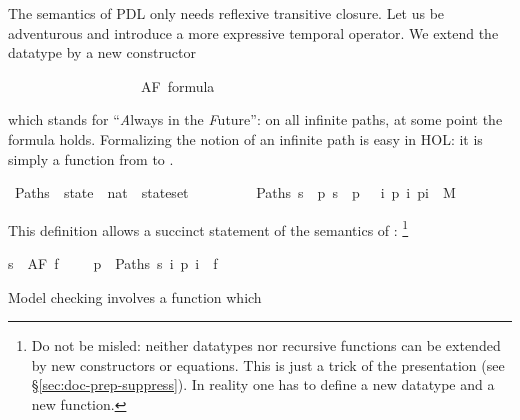 %
\begin{isabellebody}%
\def\isabellecontext{CTL}%
%
\isadelimtheory
%
\endisadelimtheory
%
\isatagtheory
%
\endisatagtheory
{\isafoldtheory}%
%
\isadelimtheory
%
\endisadelimtheory
%
\isamarkuptrue%
%
\begin{isamarkuptext}%
\label{sec:CTL}
%
The semantics of PDL only needs reflexive transitive closure.
Let us be adventurous and introduce a more expressive temporal operator.
We extend the datatype
 by a new constructor%
\end{isamarkuptext}%
\isamarkuptrue%
\ \ \ \ \ \ \ \ \ \ \ \ \ \ \ \ \ \ {\isacharbar}\ AF\ formula%
\begin{isamarkuptext}%
\noindent
which stands for ``\emph{A}lways in the \emph{F}uture'':
on all infinite paths, at some point the formula holds.
Formalizing the notion of an infinite path is easy
in HOL: it is simply a function from  to .%
\end{isamarkuptext}%
\isamarkuptrue%
\isamarkupfalse%
\ Paths\ {\isacharcolon}{\isacharcolon}\ {\isachardoublequoteopen}state\ {\isasymRightarrow}\ {\isacharparenleft}nat\ {\isasymRightarrow}\ state{\isacharparenright}set{\isachardoublequoteclose}\isanewline
\ \ \ \ \ \ \ \ \ {\isachardoublequoteopen}Paths\ s\ {\isasymequiv}\ {\isacharbraceleft}p{\isachardot}\ s\ {\isacharequal}\ p\ {}\ {\isasymand}\ {\isacharparenleft}{\isasymforall}i{\isachardot}\ {\isacharparenleft}p\ i{\isacharcomma}\ p{\isacharparenleft}i{\isacharplus}{}{\isacharparenright}{\isacharparenright}\ {\isasymin}\ M{\isacharparenright}{\isacharbraceright}{\isachardoublequoteclose}%
\begin{isamarkuptext}%
\noindent
This definition allows a succinct statement of the semantics of :
\footnote{Do not be misled: neither datatypes nor recursive functions can be
extended by new constructors or equations. This is just a trick of the
presentation (see \S\ref{sec:doc-prep-suppress}). In reality one has to define
a new datatype and a new function.}%
\end{isamarkuptext}%
\isamarkuptrue%
{\isachardoublequoteopen}s\ {\isasymTurnstile}\ AF\ f\ \ \ \ {\isacharequal}\ {\isacharparenleft}{\isasymforall}p\ {\isasymin}\ Paths\ s{\isachardot}\ {\isasymexists}i{\isachardot}\ p\ i\ {\isasymTurnstile}\ f{\isacharparenright}{\isachardoublequoteclose}%
\begin{isamarkuptext}%
\noindent
Model checking  involves a function which

\end{isamarkuptext}
\end{isabellebody}

